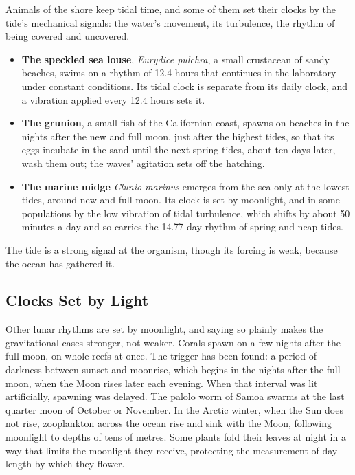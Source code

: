 \documentclass[11pt,a4paper]{article}
\begin{document}
Animals of the shore keep tidal time, and some of them set their clocks by the tide's mechanical signals: the water's movement, its turbulence, the rhythm of being covered and uncovered.
\begin{itemize}
    \item \textbf{The speckled sea louse}, \emph{Eurydice pulchra}, a small crustacean of sandy beaches, swims on a rhythm of 12.4 hours that continues in the laboratory under constant conditions. Its tidal clock is separate from its daily clock, and a vibration applied every 12.4 hours sets it.
    \item \textbf{The grunion}, a small fish of the Californian coast, spawns on beaches in the nights after the new and full moon, just after the highest tides, so that its eggs incubate in the sand until the next spring tides, about ten days later, wash them out; the waves' agitation sets off the hatching.
    \item \textbf{The marine midge} \emph{Clunio marinus} emerges from the sea only at the lowest tides, around new and full moon. Its clock is set by moonlight, and in some populations by the low vibration of tidal turbulence, which shifts by about 50 minutes a day and so carries the 14.77-day rhythm of spring and neap tides.
\end{itemize}
 The tide is a strong signal at the organism, though its forcing is weak, because the ocean has gathered it.

\subsection*{Clocks Set by Light}

Other lunar rhythms are set by moonlight, and saying so plainly makes the gravitational cases stronger, not weaker. Corals spawn on a few nights after the full moon, on whole reefs at once. The trigger has been found: a period of darkness between sunset and moonrise, which begins in the nights after the full moon, when the Moon rises later each evening. When that interval was lit artificially, spawning was delayed. The palolo worm of Samoa swarms at the last quarter moon of October or November. In the Arctic winter, when the Sun does not rise, zooplankton across the ocean rise and sink with the Moon, following moonlight to depths of tens of metres. Some plants fold their leaves at night in a way that limits the moonlight they receive, protecting the measurement of day length by which they flower.
\end{document}

